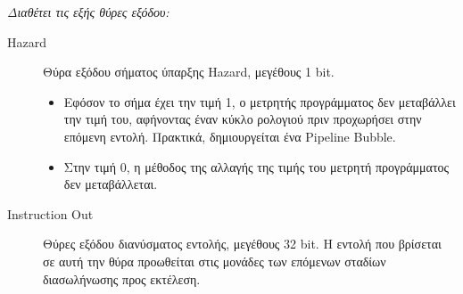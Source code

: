 \documentclass[11pt]{extarticle}
\begin{document}
\textit{Διαθέτει τις εξής θύρες εξόδου:}
\begin{description}
 \item[Hazard] Θύρα εξόδου σήματος ύπαρξης Hazard, μεγέθους 1 bit.
 \begin{itemize}
     \item Εφόσον το σήμα έχει την τιμή 1, ο μετρητής προγράμματος δεν μεταβάλλει την τιμή του, αφήνοντας έναν κύκλο ρολογιού πριν προχωρήσει στην επόμενη εντολή.
     Πρακτικά, δημιουργείται ένα Pipeline Bubble.
     \item Στην τιμή 0, η μέθοδος της αλλαγής της τιμής του μετρητή προγράμματος δεν μεταβάλλεται.
 \end{itemize} 
 \item[Instruction Out] Θύρες εξόδου διανύσματος εντολής, μεγέθους 32 bit. \newline
 Η εντολή που βρίσεται σε αυτή την θύρα προωθείται στις μονάδες των επόμενων σταδίων διασωλήνωσης προς εκτέλεση.
\end{description}
\end{document}

